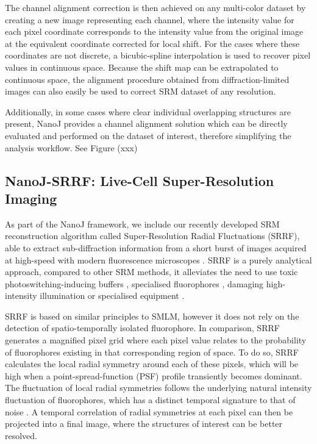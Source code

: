  The channel alignment correction is then achieved on any multi-color dataset by creating a new image representing each channel, where the intensity value for each pixel coordinate corresponds to the intensity value from the original image at the equivalent coordinate corrected for local shift. For the cases where these coordinates are not discrete, a bicubic-spline interpolation is used to recover pixel values in continuous space. Because the shift map can be extrapolated to continuous space, the alignment procedure obtained from diffraction-limited images can also easily be used to correct SRM dataset of any resolution.

 Additionally, in some cases where clear individual overlapping structures are present, NanoJ provides a channel alignment solution which can be directly evaluated and performed on the dataset of interest, therefore simplifying the analysis workflow. See Figure (xxx)

\subsection*{NanoJ-SRRF: Live-Cell Super-Resolution Imaging}
 As part of the NanoJ framework, we include our recently developed SRM reconstruction algorithm called Super-Resolution Radial Fluctuations (SRRF), able to extract sub-diffraction information from a short burst of images acquired at high-speed with modern fluorescence microscopes \cite{gustafsson2016fast,culley2018srrf}. SRRF is a purely analytical approach, compared to other SRM methods, it alleviates the need to use toxic photoswitching-inducing buffers \cite{henriques2011palm}, specialised fluorophores \cite{dempsey2011evaluation,henriques2009palm}, damaging high-intensity illumination \cite{waldchen2015light} or specialised equipment \cite{gustafsson2000surpassing,hell1994breaking}.
 
 SRRF is based on similar principles to SMLM, however it does not rely on the detection of spatio-temporally isolated fluorophore. In comparison, SRRF generates a magnified pixel grid where each pixel value relates to the probability of fluorophores existing in that corresponding region of space. To do so, SRRF calculates the local radial symmetry around each of these pixels, which will be high when a point-spread-function (PSF) profile transiently becomes dominant. The fluctuation of local radial symmetries follows the underlying natural intensity fluctuation of fluorophores, which has a distinct temporal signature to that of noise \cite{dertinger2009fast}. A temporal correlation of radial symmetries at each pixel can then be projected into a final image, where the structures of interest can be better resolved.
 
